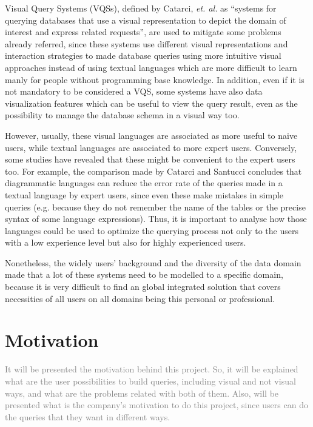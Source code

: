 Visual Query Systems (VQSs), defined by Catarci, \textit{et. al.} \cite{visualQuerySystemsForDatabases_aSurvey} as “systems for querying databases that use a visual representation to depict the domain of interest and express related requests”, are used to mitigate some problems already referred, since these systems use different visual representations and interaction strategies to made database queries using more intuitive visual approaches instead of using textual languages which are more difficult to learn manly for people without programming base knowledge. In addition, even if it is not mandatory to be considered a VQS, some systems have also data visualization features which can be useful to view the query result, even as the possibility to manage the database schema in a visual way too.

However, usually, these visual languages are associated as more useful to naive users, while textual languages are associated to more expert users.  Conversely, some studies have revealed that these might be convenient to the expert users too. For example, the comparison made by Catarci and Santucci \cite{diagrammaticVsTextualQueryLanguages_aComparativeExperiment} concludes that diagrammatic languages can reduce the error rate of the queries made in a textual language by expert users, since even these make mistakes in simple queries (e.g. because they do not remember the name of the tables or the precise syntax of some language expressions). Thus, it is important to analyse how those languages could be used to optimize the querying process not only to the users with a low experience level but also for highly experienced users.

 Nonetheless, the widely users’ background and the diversity of the data domain made that a lot of these systems need to be modelled to a specific domain, because it is very difficult to find an global integrated solution that covers necessities of all users on all domains being this personal or professional.




\section{Motivation}
\label{sec:motivation}
\textcolor{gray}{It will be presented the motivation behind this project. So, it will be explained what are the user possibilities to build queries, including visual and not visual ways, and what are the problems related with both of them. Also, will be presented what is the company's motivation to do this project, since users can do the queries that they want in different ways.}

